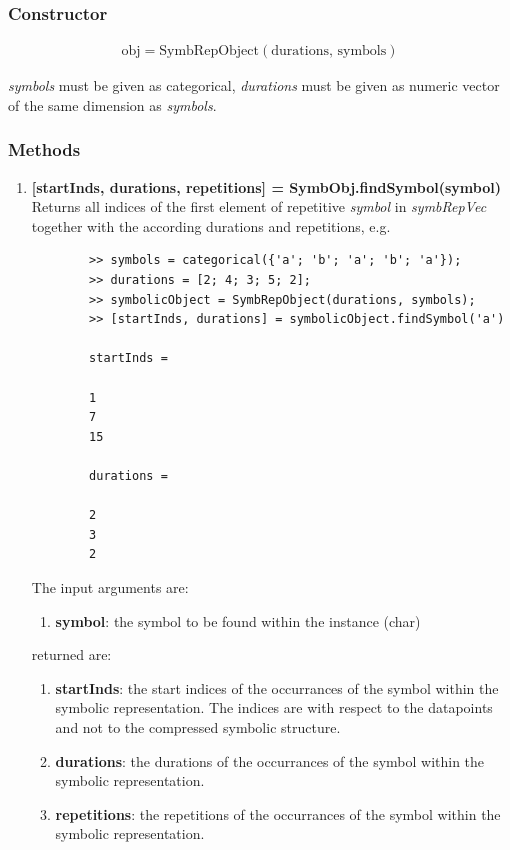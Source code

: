 \documentclass[a4]{scrreprt}
\begin{document}
\subsubsection{Constructor}

\begin{align*}
\text{obj} = \text{SymbRepObject}(\text{durations, }\text{symbols})
\end{align*}

\textit{symbols} must be given as categorical, \textit{durations} must be given as numeric vector of the same dimension as \textit{symbols}.

\subsubsection{Methods}

\begin{enumerate}
	\item \textbf{[startInds, durations, repetitions] = SymbObj.findSymbol(symbol)}\\
		Returns all indices of the first element of repetitive \textit{symbol} in \textit{symbRepVec} together with the according durations and repetitions, e.g.
		\begin{verbatim}
		>> symbols = categorical({'a'; 'b'; 'a'; 'b'; 'a'});
		>> durations = [2; 4; 3; 5; 2];
		>> symbolicObject = SymbRepObject(durations, symbols);
		>> [startInds, durations] = symbolicObject.findSymbol('a')
		
		startInds =
		
		1
		7
		15	
		
		durations =
		
		2
		3
		2
		\end{verbatim}
		
		The input arguments are:
		\begin{enumerate}
			\item \textbf{symbol}: the symbol to be found within the instance (char)
		\end{enumerate}
		returned are:
		\begin{enumerate}
			\item \textbf{startInds}: the start indices of the occurrances of the symbol within the symbolic representation. The indices are with respect to the datapoints and not to the compressed symbolic structure.
			\item \textbf{durations}: the durations of the occurrances of the symbol within the symbolic representation.
			\item \textbf{repetitions}: the repetitions of the occurrances of the symbol within the symbolic representation.
		\end{enumerate}
	

\end{enumerate}
\end{document}
